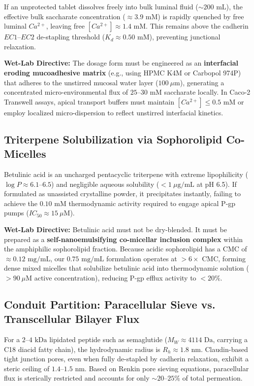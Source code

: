 \documentclass[10pt,twocolumn,letterpaper]{article}
\begin{document}
If an unprotected tablet dissolves freely into bulk luminal fluid ($\sim 200\text{ mL}$), the effective bulk saccharate concentration ($\approx 3.9\text{ mM}$) is rapidly quenched by free luminal $Ca^{2+}$, leaving free $[Ca^{2+}] \approx 1.4\text{ mM}$. This remains above the cadherin $EC1\text{--}EC2$ de-stapling threshold ($K_d \approx 0.50\text{ mM}$), preventing junctional relaxation.

\textbf{Wet-Lab Directive:} The dosage form must be engineered as an \textbf{interfacial eroding mucoadhesive matrix} (e.g., using HPMC K4M or Carbopol 974P) that adheres to the unstirred mucosal water layer ($100\ \mu\text{m}$), generating a concentrated micro-environmental flux of $25\text{--}30\text{ mM}$ saccharate locally. In Caco-2 Transwell assays, apical transport buffers must maintain $[Ca^{2+}] \le 0.5\text{ mM}$ or employ localized micro-dispersion to reflect unstirred interfacial kinetics.

\subsection{Triterpene Solubilization via Sophorolipid Co-Micelles}
Betulinic acid is an uncharged pentacyclic triterpene with extreme lipophilicity ($\log P \approx 6.1\text{--}6.5$) and negligible aqueous solubility ($<1\ \mu\text{g/mL}$ at pH 6.5). If formulated as unassisted crystalline powder, it precipitates instantly, failing to achieve the $0.10\text{ mM}$ thermodynamic activity required to engage apical P-gp pumps ($IC_{50} \approx 15\ \mu\text{M}$).

\textbf{Wet-Lab Directive:} Betulinic acid must not be dry-blended. It must be prepared as a \textbf{self-nanoemulsifying co-micellar inclusion complex} within the amphiphilic sophorolipid fraction. Because acidic sophorolipid has a CMC of $\approx 0.12\text{ mg/mL}$, our $0.75\text{ mg/mL}$ formulation operates at $>6\times\text{ CMC}$, forming dense mixed micelles that solubilize betulinic acid into thermodynamic solution ($>90\ \mu\text{M}$ active concentration), reducing P-gp efflux activity to $<20\%$.

\subsection{Conduit Partition: Paracellular Sieve vs. Transcellular Bilayer Flux}
For a $2\text{--}4\text{ kDa}$ lipidated peptide such as semaglutide ($M_W \approx 4114\text{ Da}$, carrying a C18 diacid fatty chain), the hydrodynamic radius is $R_h \approx 1.8\text{ nm}$. Claudin-based tight junction pores, even when fully de-stapled by cadherin relaxation, exhibit a steric ceiling of $1.4\text{--}1.5\text{ nm}$. Based on Renkin pore sieving equations, paracellular flux is sterically restricted and accounts for only $\sim 20\text{--}25\%$ of total permeation.
\end{document}
